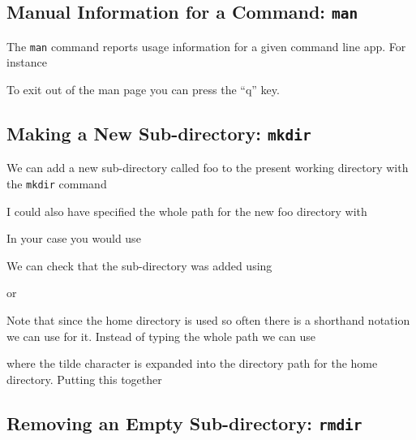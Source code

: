 \FloatBarrier
\newpage
\subsection{Manual Information for a Command: \texttt{man}}

The \texttt{man} command reports usage information for a given command line app. For instance 



To exit out of the man page you can press the ``q'' key.

\newpage
\subsection{Making a New Sub-directory: \texttt{mkdir}}

We can add a new sub-directory called foo to the present working directory with the \texttt{mkdir} command


I could also have specified the whole path for the new foo directory with 


In your case you would use


We can check that the sub-directory was added using


or 


Note that since the home directory is used so often there is a shorthand notation we can use for it. Instead of typing the whole path we can use 


where the tilde character \mytilde is expanded into the directory path for the home directory. Putting this together



\subsection{Removing an Empty Sub-directory: \texttt{rmdir}}

